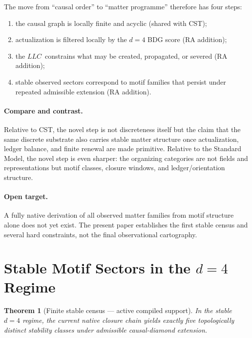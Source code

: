 \documentclass[11pt]{article}
\def\mathrm#1{#1}%
\newtheorem{theorem}{Theorem}
\newcommand{\LLC}{\ensuremath{\mathrm{LLC}}}
\begin{document}
The move from ``causal order'' to ``matter programme'' therefore has four steps:
\begin{enumerate}[nosep]
    \item the causal graph is locally finite and acyclic (shared with CST);
    \item actualization is filtered locally by the $d=4$ BDG score (RA addition);
    \item the \LLC\ constrains what may be created, propagated, or severed (RA addition);
    \item stable observed sectors correspond to motif families that persist under repeated admissible extension (RA addition).
\end{enumerate}

\paragraph{Compare and contrast.} Relative to CST, the novel step is not discreteness itself but the claim that the same discrete substrate also carries stable matter structure once actualization, ledger balance, and finite renewal are made primitive. Relative to the Standard Model, the novel step is even sharper: the organizing categories are not fields and representations but motif classes, closure windows, and ledger/orientation structure.

\paragraph{Open target.} A fully native derivation of all observed matter families from motif structure alone does not yet exist. The present paper establishes the first stable census and several hard constraints, not the final observational cartography.

\section{Stable Motif Sectors in the $d=4$ Regime}

\begin{theorem}[Finite stable census --- active compiled support]
In the stable $d=4$ regime, the current native closure chain yields exactly five topologically distinct stability classes under admissible causal-diamond extension.
\end{theorem}
\end{document}
